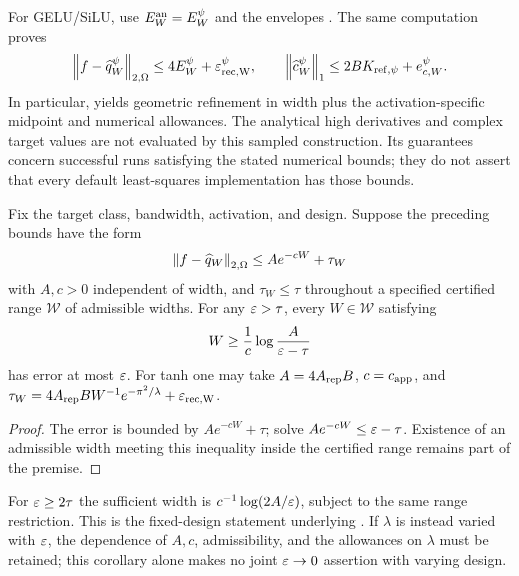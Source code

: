 For GELU/SiLU, use $E_W^{\rm an}=E_W^\psi$ and the envelopes
. The same computation proves
\begin{equation}
 \left\lVert f-\widehat q_W^\psi\right\rVert_{2,\Omega}
 \le4E_W^\psi+\varepsilon_{\rm rec,W}^\psi,
 \qquad
 \left\lVert \widehat c_W^\psi\right\rVert_1\le2BK_{{\rm ref},\psi}+e_{c,W}^\psi.
 \label{eq:psi-computed}
\end{equation}
In particular,  yields geometric refinement in width plus
the activation-specific midpoint and numerical allowances. The analytical
high derivatives and complex target values are not evaluated by this sampled
construction. Its guarantees concern successful runs satisfying the stated
numerical bounds; they do not assert that every default least-squares
implementation has those bounds.

\begin{corollary}
\label{cor:logwidth}
Fix the target class, bandwidth, activation, and design. Suppose the preceding
bounds have the form
\[
 \left\lVert f-\widehat q_W\right\rVert_{2,\Omega}\le A e^{-cW}+\tau_W
\]
with $A,c>0$ independent of width, and $\tau_W\le\tau$ throughout a specified
certified range $\mathcal W$ of admissible widths. For any $\varepsilon>\tau$, every
$W\in\mathcal W$ satisfying
\begin{equation}
 W\ge\frac1c\log\frac A{\varepsilon-\tau}
 \label{eq:log-width}
\end{equation}
has error at most $\varepsilon$. For tanh one may take $A=4A_{\rm rep}B$,
$c=c_{\mathrm{app}}$, and
$\tau_W=4A_{\rm rep}B W^{-1}e^{-\pi^2/\lambda}+\varepsilon_{\rm rec,W}$.
\end{corollary}
\begin{proof}
The error is bounded by $Ae^{-cW}+\tau$; solve
$Ae^{-cW}\le\varepsilon-\tau$. Existence of an admissible width meeting this
inequality inside the certified range remains part of the premise.
\end{proof}
For $\varepsilon\ge2\tau$ the sufficient width is
$c^{-1}\log(2A/\varepsilon)$, subject to the same range restriction. This is the
fixed-design statement underlying \QUILLMainCorollary. If $\lambda$ is
instead varied with $\varepsilon$, the dependence of $A,c$, admissibility, and the
allowances on $\lambda$ must be retained; this corollary alone makes no joint
$\varepsilon\to0$ assertion with varying design.
